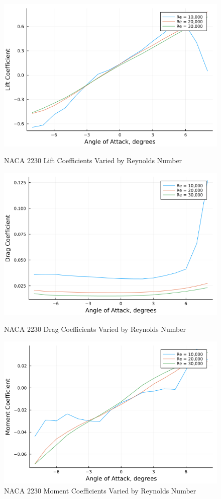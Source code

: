 \documentclass{article}
\begin{document}
\begin{figure}[!htb]
  \includegraphics[width=\linewidth]{Figure7.png}
  \caption{NACA 2230 Lift Coefficients Varied by Reynolds Number}\label{fig:7}
\endminipage\hfill
{}
  \includegraphics[width=\linewidth]{Figure8.png}
  \caption{NACA 2230 Drag Coefficients Varied by Reynolds Number}\label{fig:8}
\endminipage\hfill
{}
  \includegraphics[width=\linewidth]{Figure9.png}
  \caption{NACA 2230 Moment Coefficients Varied by Reynolds Number}\label{fig:9}
\endminipage
\end{figure}
\end{document}
